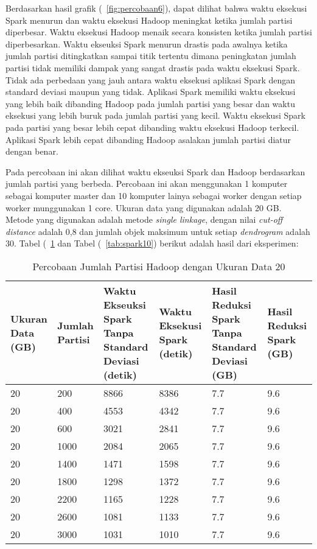 Berdasarkan hasil grafik (~\ref{fig:percobaan6}), dapat dilihat bahwa waktu eksekusi Spark menurun dan waktu eksekusi Hadoop meningkat ketika jumlah partisi diperbesar. Waktu eksekusi Hadoop menaik secara konsisten ketika jumlah partisi diperbesarkan. Waktu ekseuksi Spark menurun drastis pada awalnya ketika jumlah partisi ditingkatkan sampai titik tertentu dimana peningkatan jumlah partisi tidak memiliki dampak yang sangat drastis pada waktu eksekusi Spark. Tidak ada perbedaan yang jauh antara waktu eksekusi aplikasi Spark dengan standard deviasi maupun yang tidak. Aplikasi Spark memiliki waktu eksekusi yang lebih baik dibanding Hadoop pada jumlah partisi yang besar dan waktu eksekusi yang lebih buruk pada jumlah partisi yang kecil. Waktu eksekusi Spark pada partisi yang besar lebih cepat dibanding waktu eksekusi Hadoop terkecil. Aplikasi Spark lebih cepat dibanding Hadoop asalakan jumlah partisi diatur dengan benar.




Pada percobaan ini akan dilihat waktu ekseuksi Spark dan Hadoop berdasarkan jumlah partisi yang berbeda. Percobaan ini akan menggunakan 1 komputer sebagai komputer master dan 10 komputer lainya sebagai worker dengan setiap worker munggunakan 1 core. Ukuran data yang digunakan adalah 20 GB. Metode yang digunakan adalah metode \textit{single linkage}, dengan nilai \textit{cut-off distance} adalah 0,8 dan jumlah objek maksimum untuk setiap \textit{dendrogram} adalah 30. Tabel (~\ref{tab:spark9} dan Tabel (~\ref{tab:spark10}) berikut adalah hasil dari eksperimen:

\begin{table}[H] 
	\centering 
	\caption{Percobaan Jumlah Partisi Hadoop dengan Ukuran Data 20}
	\label{tab:spark9}
	\begin{tabular}{|p{1cm}|p{1cm}|p{3cm}|p{3cm}|p{3cm}|p{3cm}|}
\hline
Ukuran Data (GB) & Jumlah Partisi &  Waktu Ekseuksi Spark Tanpa Standard Deviasi (detik) & Waktu Eksekusi Spark (detik) & Hasil Reduksi Spark Tanpa Standard Deviasi (GB) & Hasil Reduksi Spark (GB)  \\ 
\hline
20 & 200 & 8866  & 8386  & 7.7 & 9.6 \\
\hline
20 & 400 & 4553  & 4342  & 7.7 & 9.6 \\
\hline
20 & 600 & 3021  & 2841  &  7.7 & 9.6 \\
\hline
20 & 1000 & 2084  & 2065  & 7.7 & 9.6 \\
\hline
20 & 1400 & 1471  & 1598  & 7.7 & 9.6 \\
\hline
20 & 1800 & 1298  & 1372  & 7.7 & 9.6 \\
\hline
20 & 2200 & 1165  & 1228  & 7.7 & 9.6 \\
\hline
20 & 2600 & 1081  & 1133  & 7.7 & 9.6 \\
\hline
20 & 3000 & 1031  & 1010  & 7.7 & 9.6 \\
\hline

\hline

	\end{tabular} 
\end{table}



